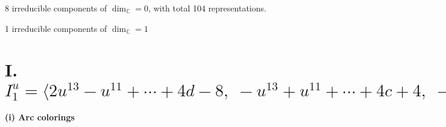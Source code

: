 \documentclass[1p]{elsarticle_modified}
\theoremstyle{definition}
\begin{document}
\raggedright * 8 irreducible components of $\dim_{\mathbb{C}}=0$, with total 104 representations.\\
\raggedright * 1 irreducible components of $\dim_{\mathbb{C}}=1$ \\
\newpage
\renewcommand{\arraystretch}{1}
\centering \section*{I. $I^u_{1}= \langle 2 u^{13}- u^{11}+\cdots+4 d-8,\;- u^{13}+u^{11}+\cdots+4 c+4,\;- u^{13}+u^{11}+\cdots+2 b+2,\;3 u^{13}-2 u^{11}+\cdots+4 a-12,\;u^{14}- u^{13}+\cdots+4 u^2+4 \rangle$}
\flushleft \textbf{(i) Arc colorings}\\
\end{document}

